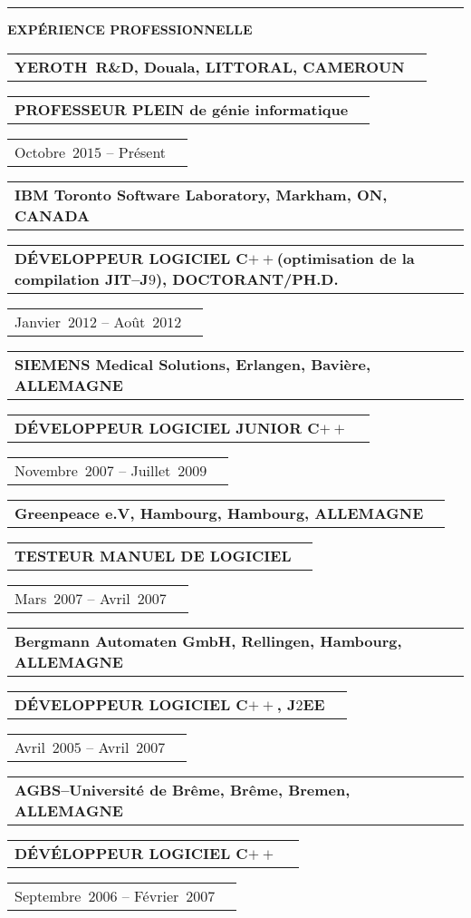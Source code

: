 \documentclass[9pt,a4paper]{article} %
\makeatletter
\newcommand{\headerrow}[2]
{\begin{tabular*}{\linewidth}{l@{\extracolsep{\fill}}r}
	#1 &
	#2 \\
\end{tabular*}}
\newcommand{\headerrowONE}[1]{\headerrow{#1}{}}
\newcommand{\jtwoee}{J$2$EE\xspace}
\newcommand{\cplusplus}{C$++$\xspace}
\newcommand{\cvitemdate}[2]{#1~$#2$\xspace}
\newcommand{\cvitempositionheld}[1]{\textbf{#1}\xspace}
\makeatother
\begin{document}
\vspace{1em}


\hrule
\begin{center}
{\large \textbf{EXPÉRIENCE PROFESSIONNELLE}}
\end{center}

\vspace{0.5em}

\headerrowONE{\textbf{YEROTH~R\&D, Douala, LITTORAL, CAMEROUN}}
\headerrowONE{\cvitempositionheld{PROFESSEUR PLEIN de génie informatique}}
\headerrowONE{\cvitemdate{Octobre}{2015} -- Présent}	
	
\vspace{0.3em}

\headerrowONE{\textbf{IBM Toronto Software Laboratory, Markham, ON, CANADA}}	
\headerrowONE{\cvitempositionheld{DÉVELOPPEUR LOGICIEL \cplusplus (optimisation de la compilation JIT--J$9$), DOCTORANT/PH.D.}}
\headerrowONE{\cvitemdate{Janvier}{2012} -- \cvitemdate{Août}{2012}}	

\vspace{0.3em}

\headerrowONE{\textbf{SIEMENS Medical Solutions, Erlangen, Bavière, ALLEMAGNE}}	
\headerrowONE{\cvitempositionheld{DÉVELOPPEUR LOGICIEL JUNIOR \cplusplus}}
\headerrowONE{\cvitemdate{Novembre}{2007} -- \cvitemdate{Juillet}{2009}}	
	
\vspace{0.3em}

\headerrowONE{\textbf{Greenpeace e.V, Hambourg, Hambourg, ALLEMAGNE}}	
\headerrowONE{\cvitempositionheld{TESTEUR MANUEL DE LOGICIEL}}
\headerrowONE{\cvitemdate{Mars}{2007} -- \cvitemdate{Avril}{2007}}	

\vspace{0.3em}

\headerrowONE{\textbf{Bergmann Automaten GmbH, Rellingen, Hambourg, ALLEMAGNE}}	
\headerrowONE{\cvitempositionheld{DÉVELOPPEUR LOGICIEL \cplusplus, \jtwoee}}
\headerrowONE{\cvitemdate{Avril}{2005} -- \cvitemdate{Avril}{2007}}	
	
\vspace{0.3em}

\headerrowONE{\textbf{AGBS--Université de Brême, Brême, Bremen, ALLEMAGNE}}	
\headerrowONE{\cvitempositionheld{DÉVÉLOPPEUR LOGICIEL \cplusplus}}
\headerrowONE{\cvitemdate{Septembre}{2006} -- \cvitemdate{Février}{2007}}	

\vspace{0.3em}
\end{document}
